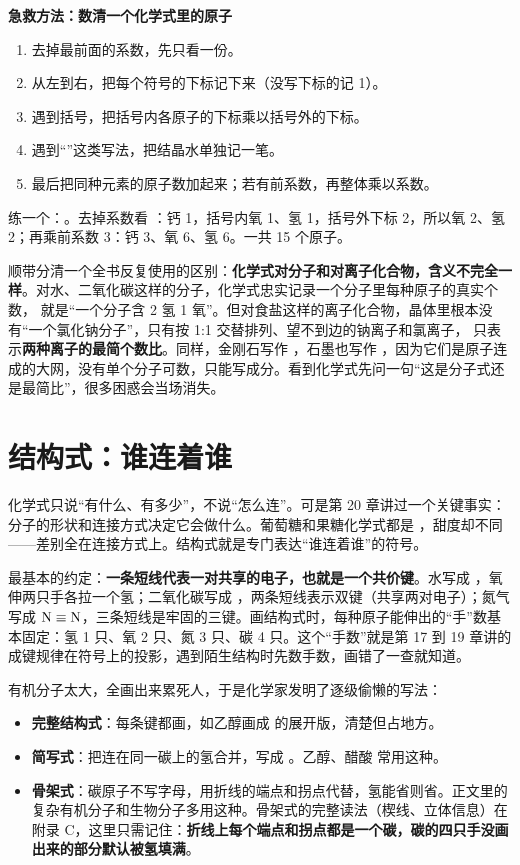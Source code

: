 \textbf{急救方法：数清一个化学式里的原子}

\begin{enumerate}[itemsep=2pt]
\item 去掉最前面的系数，先只看一份。
\item 从左到右，把每个符号的下标记下来（没写下标的记 1）。
\item 遇到括号，把括号内各原子的下标乘以括号外的下标。
\item 遇到“”这类写法，把结晶水单独记一笔。
\item 最后把同种元素的原子数加起来；若有前系数，再整体乘以系数。
\end{enumerate}

练一个：。去掉系数看 ：钙 1，括号内氧 1、氢 1，括号外下标 2，所以氧 2、氢 2；再乘前系数 3：钙 3、氧 6、氢 6。一共 15 个原子。

顺带分清一个全书反复使用的区别：\textbf{化学式对分子和对离子化合物，含义不完全一样}。对水、二氧化碳这样的分子，化学式忠实记录一个分子里每种原子的真实个数， 就是“一个分子含 2 氢 1 氧”。但对食盐这样的离子化合物，晶体里根本没有“一个氯化钠分子”，只有按 1:1 交替排列、望不到边的钠离子和氯离子， 只表示\textbf{两种离子的最简个数比}。同样，金刚石写作 ，石墨也写作 ，因为它们是原子连成的大网，没有单个分子可数，只能写成分。看到化学式先问一句“这是分子式还是最简比”，很多困惑会当场消失。

\section{结构式：谁连着谁}

化学式只说“有什么、有多少”，不说“怎么连”。可是第 20 章讲过一个关键事实：分子的形状和连接方式决定它会做什么。葡萄糖和果糖化学式都是 ，甜度却不同——差别全在连接方式上。结构式就是专门表达“谁连着谁”的符号。

最基本的约定：\textbf{一条短线代表一对共享的电子，也就是一个共价键}。水写成 ，氧伸两只手各拉一个氢；二氧化碳写成 ，两条短线表示双键（共享两对电子）；氮气写成 $\mathrm{N}\equiv\mathrm{N}$，三条短线是牢固的三键。画结构式时，每种原子能伸出的“手”数基本固定：氢 1 只、氧 2 只、氮 3 只、碳 4 只。这个“手数”就是第 17 到 19 章讲的成键规律在符号上的投影，遇到陌生结构时先数手数，画错了一查就知道。

有机分子太大，全画出来累死人，于是化学家发明了逐级偷懒的写法：

\begin{itemize}[itemsep=2pt]
\item \textbf{完整结构式}：每条键都画，如乙醇画成  的展开版，清楚但占地方。
\item \textbf{简写式}：把连在同一碳上的氢合并，写成 。乙醇、醋酸  常用这种。
\item \textbf{骨架式}：碳原子不写字母，用折线的端点和拐点代替，氢能省则省。正文里的复杂有机分子和生物分子多用这种。骨架式的完整读法（楔线、立体信息）在附录 C，这里只需记住：\textbf{折线上每个端点和拐点都是一个碳，碳的四只手没画出来的部分默认被氢填满}。
\end{itemize}

